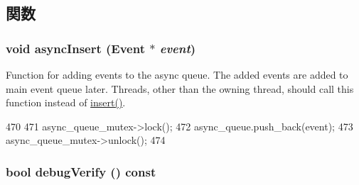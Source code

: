 \subsection{関数}
\hypertarget{classEventQueue_aadb31d9952f03cb2a934f93cac304153}{
\subsubsection[{asyncInsert}]{\setlength{\rightskip}{0pt plus 5cm}void asyncInsert (Event $\ast$ {\em event})}}
\label{classEventQueue_aadb31d9952f03cb2a934f93cac304153}
Function for adding events to the async queue. The added events are added to main event queue later. Threads, other than the owning thread, should call this function instead of \hyperlink{classEventQueue_ad8e469f292d876af9e2ec380e8e7e51e}{insert()}. 


\begin{DoxyCode}
470 {
471     async_queue_mutex->lock();
472     async_queue.push_back(event);
473     async_queue_mutex->unlock();
474 }
\end{DoxyCode}
\hypertarget{classEventQueue_a66392764e022762d90e80efbee0500b2}{
\subsubsection[{debugVerify}]{\setlength{\rightskip}{0pt plus 5cm}bool debugVerify () const}}
\label{classEventQueue_a66392764e022762d90e80efbee0500b2}



